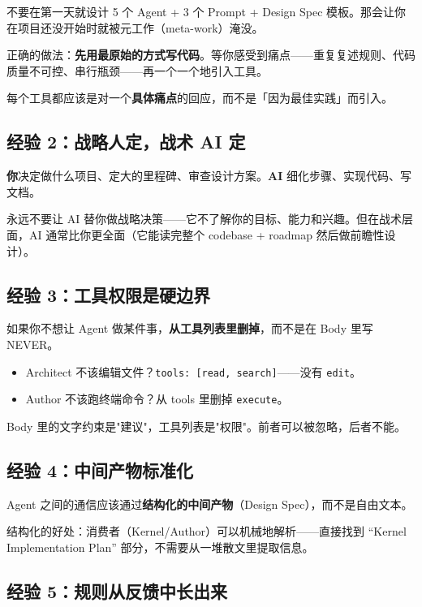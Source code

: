 不要在第一天就设计 5 个 Agent + 3 个 Prompt + Design Spec 模板。那会让你在项目还没开始时就被元工作（meta-work）淹没。

正确的做法：\textbf{先用最原始的方式写代码}。等你感受到痛点——重复复述规则、代码质量不可控、串行瓶颈——再一个一个地引入工具。

每个工具都应该是对一个\textbf{具体痛点}的回应，而不是「因为最佳实践」而引入。

\subsection{经验 2：战略人定，战术 AI 定}

\textbf{你}决定做什么项目、定大的里程碑、审查设计方案。\textbf{AI} 细化步骤、实现代码、写文档。

永远不要让 AI 替你做战略决策——它不了解你的目标、能力和兴趣。但在战术层面，AI 通常比你更全面（它能读完整个 codebase + roadmap 然后做前瞻性设计）。

\subsection{经验 3：工具权限是硬边界}

如果你不想让 Agent 做某件事，\textbf{从工具列表里删掉}，而不是在 Body 里写 NEVER。

\begin{itemize}
  \item Architect 不该编辑文件？\texttt{tools: [read, search]}——没有 \texttt{edit}。
  \item Author 不该跑终端命令？从 tools 里删掉 \texttt{execute}。
\end{itemize}

Body 里的文字约束是"建议"，工具列表是"权限"。前者可以被忽略，后者不能。

\subsection{经验 4：中间产物标准化}

Agent 之间的通信应该通过\textbf{结构化的中间产物}（Design Spec），而不是自由文本。

结构化的好处：消费者（Kernel/Author）可以机械地解析——直接找到 ``Kernel Implementation Plan'' 部分，不需要从一堆散文里提取信息。

\subsection{经验 5：规则从反馈中长出来}

